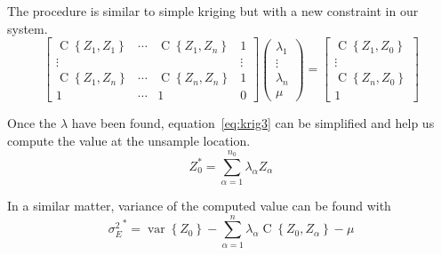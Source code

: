 \documentclass[twocolumn]{article}
\numberwithin{equation}{section}
\begin{document}
The procedure is similar to simple kriging but with a new constraint in our system.
\[
		\begin{bmatrix}
       		\operatorname{C}\left\{Z_1,Z_1\right\} 	& \cdots 	& \operatorname{C}\left\{Z_1,Z_n\right\} & 1  		\\
       		\vdots 									& 			& 										& \vdots 	\\
       		\operatorname{C}\left\{Z_1,Z_n\right\}  	& \cdots 	& \operatorname{C}\left\{Z_n,Z_n\right\}	& 1			\\
       		1										& \cdots	 	& 1										& 0
     	\end{bmatrix}
     	\begin{pmatrix}
       		\lambda_1 	\\
       		\vdots 		\\
       		\lambda_n	\\
       		\mu  
     	\end{pmatrix}
     	=
     	\begin{bmatrix}
       		\operatorname{C}\left\{Z_1,Z_0\right\} 	\\
       		\vdots 									\\
       		\operatorname{C}\left\{Z_n,Z_0\right\} 	\\
       		1
     	\end{bmatrix}
\] 

Once the $\lambda$ have been found, equation~\ref{eq:krig3} can be simplified and help us compute the value at the unsample location.
\begin{equation}
	Z_0^* =  \sum_{\alpha=1}^{n_0}\lambda_\alpha Z_\alpha
\end{equation}

In a similar matter, variance of the computed value can be found with
\begin{equation}
	{\sigma^2_E}^*  = \operatorname{var}\left\{Z_0\right\} - \sum_{\alpha=1}^n \lambda_\alpha \operatorname{C}\left\{Z_0, Z_\alpha\right\} -\mu
\end{equation}
\end{document}
